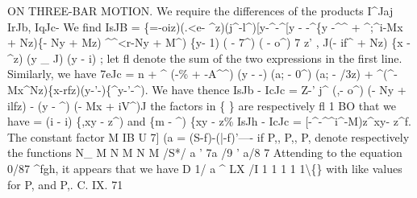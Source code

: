 \documentclass[11pt,a4paper]{book}
\begin{document}
ON THREE-BAR MOTION.
We require the
differences of the products I\textasciicircum{}Jaj IrJb, IqJc-
We
find
IsJB = \{\guillemotright{}=-oiz)(.<e- \textasciicircum{}z)(j\textasciicircum{}-l\textasciicircum{})[y-\textasciicircum{}-\textasciicircum{}[y - -\textasciicircum{}\{y -\textasciicircum{}\textasciicircum{} + \textasciicircum{};\textasciicircum{}i-Mx + Nz)\{- Ny + Mz)
\textasciicircum{}\textasciicircum{}<r-Ny + M\textasciicircum{}) \{y- 1) (\guillemotleft{} - 7\textasciicircum{}) (\guillemotleft{} - o\textasciicircum{})
7\guillemotleft{}
z'
, J(-
i\guillemotright{}f\textasciicircum{} + Nz) \{x - \textasciicircum{}z) (y \_
J) (y - i)
;
let
fl denote the sum of the two expressions
in the
first
line.
Similarly, we have
7eJc = n + \textasciicircum{} (-\% + -A\textasciicircum{}\textasciicircum{}) (y -
-)
(a; - 0\textasciicircum{}) (a; - /3z)
+ \textasciicircum{}(\textasciicircum{}-Mx\textasciicircum{}Nz)\{x-rfz)(y-'-)\{\textasciicircum{}y-'-\textasciicircum{}).
We have thence
IsJb - IcJc = Z-' j\textasciicircum{} (\guillemotright{},- o\textasciicircum{}) (- Ny + ilfz) - (y - \textasciicircum{}) (- Mx + iV\textasciicircum{})J
the
factors
in
\{
\} are respectively
fl
1
BO that we have
= (i - i) \{,xy - z\textasciicircum{}) and \{m - \textasciicircum{}) \{xy - z\%
IsJh - IcJc = [-\textasciicircum{}-\textasciicircum{}\textasciicircum{}i\textasciicircum{}-M)z\textasciicircum{}xy- z\textasciicircum{}f.
The constant
factor
M
IB
U
7] (a
= (S-f)-(|-f)'----
if P,, P,, P, denote respectively the functions
N\_
M
N
M
N
M
/S*/
a
'
7a
/9
'
a/8
7
Attending to the equation 0/87 \textasciicircum{}fgh,
it appears that we have
D
1/
a
\textasciicircum{}
LX
/I
1
1
1
1
1\textbackslash\{\}
with
like
values
for P, and
P,.
C.
IX.
71
\end{document}
